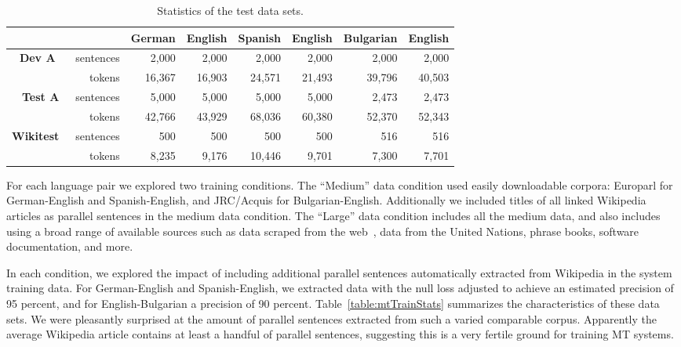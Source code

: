 \begin{table}[ht]
\small
\begin{center}
\begin{tabular}{|rr||r|r||r|r||r|r|}
\hline
      &                & German        & English       & Spanish       & English      & Bulgarian     & English   \\
\hline
\textbf{Dev A} \
      & sentences      & 2,000         & 2,000         & 2,000         & 2,000        & 2,000         & 2,000     \\
      & tokens    & 16,367        & 16,903        & 24,571        & 21,493       & 39,796        & 40,503    \\
\hline
\textbf{Test A}\
      & sentences      & 5,000         & 5,000         & 5,000         & 5,000        & 2,473         & 2,473     \\
      & tokens    & 42,766        & 43,929        & 68,036        & 60,380       & 52,370        & 52,343    \\
\hline
\textbf{Wikitest}\
      & sentences    & 500           & 500           & 500           & 500          & 516           & 516       \\
      & tokens    & 8,235         & 9,176         & 10,446        & 9,701        & 7,300         & 7,701     \\
\hline
\end{tabular}
\end{center}
\caption{Statistics of the test data sets.}
\label{table:mtTestStats}
\end{table}

For each language pair we explored two training conditions.  The
``Medium'' data
condition used easily downloadable corpora: Europarl for German-English and
Spanish-English, and JRC/Acquis for Bulgarian-English.  Additionally we
included titles of all linked Wikipedia articles as parallel sentences in
the medium data condition.  The ``Large'' data condition includes all the
medium
data, and also includes using a broad range of available sources such as
data scraped from the web~\citep{Resnik03}, data from the United
Nations, phrase books, software documentation, and more.

In each condition, we explored the impact of including additional
parallel sentences automatically extracted from Wikipedia in the
system training data. For German-English and Spanish-English, we
extracted data with the null loss adjusted to
achieve an estimated precision of 95 percent, and for
English-Bulgarian a precision of 90 percent. %
Table~\ref{table:mtTrainStats} summarizes the characteristics of
these data sets.  We were pleasantly surprised at the amount of
parallel sentences extracted from such a varied comparable corpus.
Apparently the average Wikipedia article contains at least a
handful of parallel sentences, suggesting this is a very fertile
ground for training MT systems.

